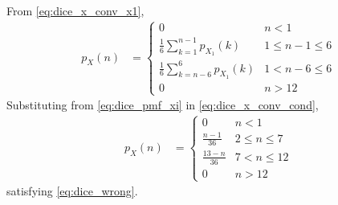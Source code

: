 \documentclass[journal,10pt,twocolumn]{IEEEtran}
\newcounter{Chapcounter}
\numberwithin{equation}{subsection}
\numberwithin{figure}{subsection}
\renewcommand\thesection{\theChapcounter.\arabic{section}}
\renewcommand\thesection{\arabic{section}}
\renewcommand\thesubsection{\thesection.\arabic{subsection}}
\begin{document}
\begin{enumerate}[label=\thesubsection.\arabic*.,ref=\thesubsection.\arabic{figure}]
\begin{align}
\end{align}
From \eqref{eq:dice_x_conv_x1},
%
\begin{align}
p_X(n) &= 
\begin{cases}
0 & n < 1
\\
\frac{1}{6}\sum_{k=1}^{n-1}p_{X_1}(k) &  1 \le n-1 \le  6
\\
\frac{1}{6}\sum_{k=n-6}^{6}p_{X_1}(k) & 1 < n-6 \le 6
\\
0 & n > 12
\end{cases}
\label{eq:dice_x_conv_cond}
\end{align}
Substituting from \eqref{eq:dice_pmf_xi} in \eqref{eq:dice_x_conv_cond},
\begin{align}
p_X(n) &= 
\begin{cases}
0 & n < 1
\\
\frac{n-1}{36} &  2 \le n \le  7
\\
\frac{13-n}{36} & 7 < n \le 12
\\
0 & n > 12
\end{cases}
\label{eq:dice_x_conv_final}
\end{align}
satisfying \eqref{eq:dice_wrong}.


\end{enumerate}
\end{document}
